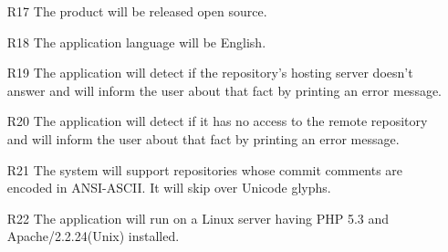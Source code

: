 \documentclass[12pt]{scrartcl}
\begin{document}
\begin{enumerate}
\item [R17] The product will be released open source.
\item [R18] The application language will be English.
\item [R19] The application will detect if the repository's hosting server doesn't answer and will inform the user about that fact by printing an error message.
\item [R20] The application will detect if it has no access to the remote repository and will inform the user about that fact by printing an error message.
\item [R21] The system will support repositories whose commit comments are encoded in
	ANSI-ASCII. It will skip over Unicode glyphs.
\item [R22] The application will run on a Linux server having PHP 5.3 and Apache/2.2.24(Unix) installed.
\end{enumerate}
\end{document}
